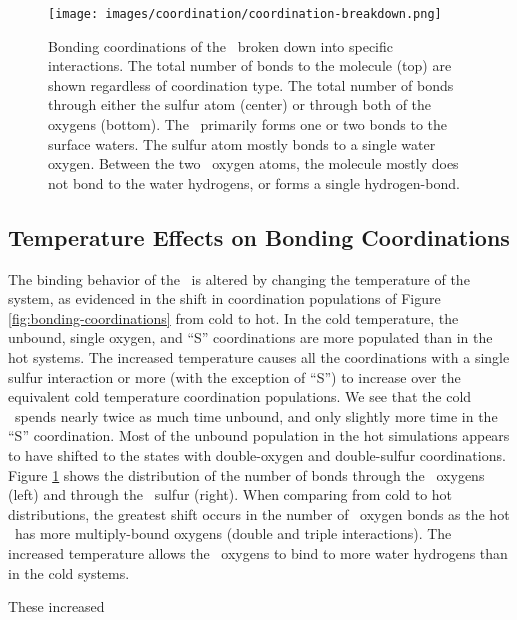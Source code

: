 \begin{figure}[h!]
	\begin{center}
		\texttt{[image: images/coordination/coordination-breakdown.png]}
		\caption{Bonding coordinations of the \suldiox~broken down into specific interactions. The total number of bonds to the molecule (top) are shown regardless of coordination type. The total number of bonds through either the sulfur atom (center) or through both of the oxygens (bottom). The \suldiox~primarily forms one or two bonds to the surface waters. The sulfur atom mostly bonds to a single water oxygen. Between the two \suldiox~oxygen atoms, the molecule mostly does not bond to the water hydrogens, or forms a single hydrogen-bond.}
		\label{fig:coordination-breakdown}
	\end{center}
\end{figure}


\subsection {Temperature Effects on Bonding Coordinations}

The binding behavior of the \suldiox~is altered by changing the temperature of the system, as evidenced in the shift in coordination populations of Figure \ref{fig:bonding-coordinations} from cold to hot. In the cold temperature, the unbound, single oxygen, and ``S'' coordinations are more populated than in the hot systems. The increased temperature causes all the coordinations with a single sulfur interaction or more (with the exception of ``S'') to increase over the equivalent cold temperature coordination populations. We see that the cold \suldiox~spends nearly twice as much time unbound, and only slightly more time in the ``S'' coordination. Most of the unbound population in the hot simulations appears to have shifted to the states with double-oxygen and double-sulfur coordinations. Figure \ref{fig:coordination-breakdown} shows the distribution of the number of bonds through the \suldiox~oxygens (left) and through the \suldiox~sulfur (right). When comparing from cold to hot distributions, the greatest shift occurs in the number of \suldiox~oxygen bonds as the hot \suldiox~has more multiply-bound oxygens (double and triple interactions). The increased temperature allows the \suldiox~oxygens to bind to more water hydrogens than in the cold systems.

These increased 
